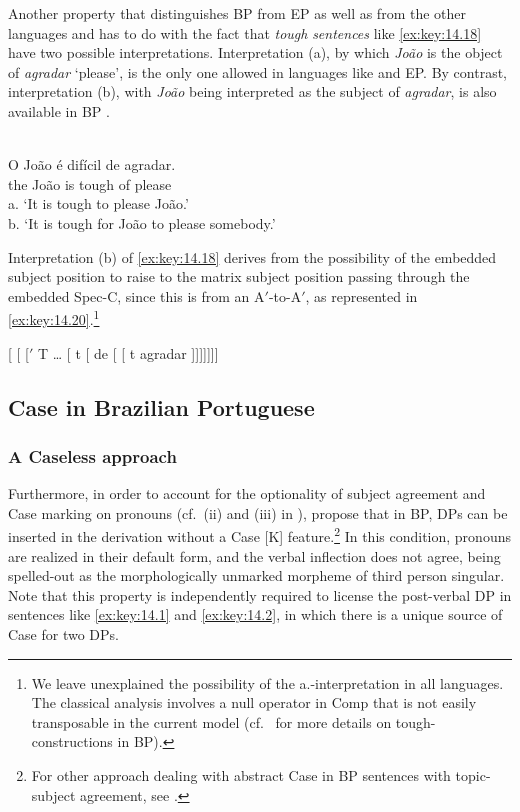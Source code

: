 \documentclass[output=paper]{langsci/langscibook}
\begin{document}
Another property that distinguishes \gls{BP} from \gls{EP} as well as from
the other  languages and  has to do with the fact that
\emph{tough} \emph{sentences} like \eqref{ex:key:14.18} have two possible
interpretations. Interpretation (a), by which \emph{João} is the object of
\emph{agradar} ‘please’, is the only one allowed in languages like  and
EP. By contrast, interpretation (b), with \emph{João} being interpreted as the
subject of \emph{agradar}, is also available in \gls{BP} \citep{Galves1987}.

\ea%
    \label{ex:key:14.18}\\
    \gll    O João é difícil de agradar.\\
            the João is tough of please\\
    \glt    a. ‘It is tough to please João.’\\
            b. ‘It is tough for João to please somebody.’
\z

Interpretation (b) of  \eqref{ex:key:14.18} derives from the possibility of the
embedded subject position to raise to the matrix subject position passing
through the embedded Spec-C, since this  is from an A$'$-to-A$'$, as
represented in \eqref{ex:key:14.20}.\footnote{We leave unexplained the possibility
of the a.-interpretation in all languages. The classical analysis involves a
null operator in Comp that is not easily transposable in the current model
(cf.\ \citealt{Moreno2014} for more details on tough-constructions in BP).}

\ea\label{ex:key:14.19}
    {}[ [ [$'$ T \dots{} [ t [ de
    [ [ t agradar ]]]]]]]
\z

\subsection{Case in Brazilian Portuguese}\label{sec:key:14.4.2}

\subsubsection{A Caseless approach}\label{sec:key:15.4.2.1}

Furthermore, in order to account for the optionality of subject agreement and
Case marking on pronouns (cf.\ (ii) and (iii) in ),
\textcite{AvelarGalves2011,AvelarGalves2016} propose that in BP, DPs can be inserted in the
derivation without a Case [K] feature.\footnote{For other approach dealing with
abstract Case in \gls{BP} sentences with topic-subject agreement, see
\citet{Nunes2017}.} In this condition, pronouns are realized in their default
form, and the verbal inflection does not agree, being spelled-out as the
morphologically unmarked morpheme of third person singular. Note that this
property is independently required to license the post-verbal DP in sentences
like \eqref{ex:key:14.1} and \eqref{ex:key:14.2}, in which there is a unique
source of Case for two DPs.
\end{document}
